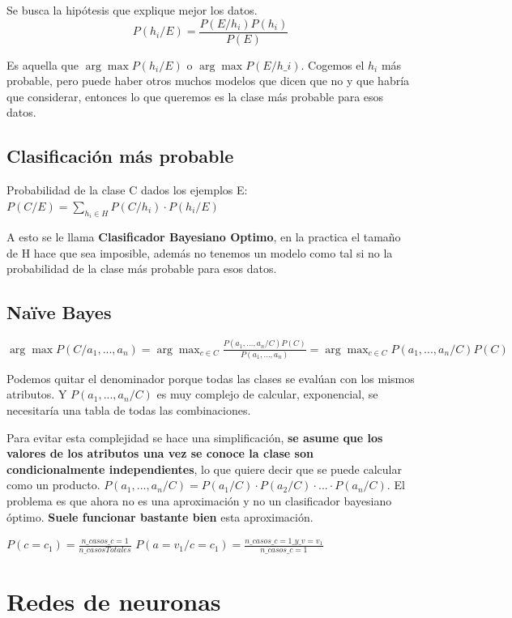\documentclass[12pt]{report} %
\begin{document}
Se busca la hipótesis que explique mejor los datos.
\[P(h_i/E)= \frac {P(E/h_i)P(h_i)}{P(E)}\]

Es aquella que \(\arg \max P(h_i/E)\) o $\arg \max P(E/h\_i) $.
Cogemos el \(h_i\) más probable, pero puede haber otros muchos modelos
que dicen que no y que habría que considerar, entonces lo que queremos
es la clase más probable para esos datos.

\subsection{Clasificación más
probable}

Probabilidad de la clase C dados los ejemplos E:
\(P(C/E) = \sum _{h_i \in H} P(C/h_i) \cdot P(h_i/E)\)

A esto se le llama \textbf{Clasificador Bayesiano Optimo}, en la
practica el tamaño de H hace que sea imposible, además no tenemos un
modelo como tal si no la probabilidad de la clase más probable para esos
datos.

\subsection{Naïve Bayes}

\(\arg \max P(C/a_1, ...,a_n)= \arg \max _{c \in C} \frac {P(a_1, ...,a_n/C)P(C)}{P(a_1, ...,a_n)}=\arg \max_{c \in C} P(a_1, ...,a_n/C)P(C)\)

Podemos quitar el denominador porque todas las clases se evalúan con los
mismos atributos. Y \(P(a_1, ...,a_n/C)\) es muy complejo de calcular,
exponencial, se necesitaría una tabla de todas las combinaciones.

Para evitar esta complejidad se hace una simplificación, \textbf{se
asume que los valores de los atributos una vez se conoce la clase son
condicionalmente independientes}, lo que quiere decir que se puede
calcular como un producto.
\(P(a_1, ...,a_n/C) = P(a_1/C) \cdot P(a_2/C) \cdot ... \cdot P(a_n/C)\).
El problema es que ahora no es una aproximación y no un clasificador
bayesiano óptimo. \textbf{Suele funcionar bastante bien} esta
aproximación.

\(P(c=c_1)= \frac {n\_casos\_c=1}{n\_casosTotales}\)
\(P(a=v_1/c=c_1)= \frac {n\_casos\_c=1\_y\_v=v_1}{n\_casos\_c=1}\)

\section{Redes de neuronas}
\end{document}
